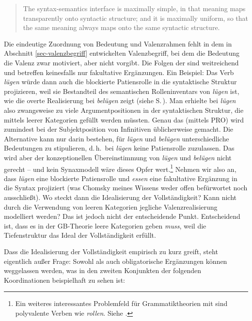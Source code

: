 \begin{quote}
The syntax-semantics interface is maximally simple, in that meaning maps transparently onto syntactic structure; and it is maximally uniform, so that the same meaning always maps onto the same syntactic structure. \citep[47]{Culicover:Jackendoff:05}
\end{quote}
Die eindeutige Zuordnung von Bedeutung und Valenzrahmen fehlt in dem in Abschnitt \ref{sec-valenzbegriff} entwickelten Valenzbegriff, bei dem die Bedeutung die Valenz zwar motiviert, aber nicht vorgibt. Die Folgen der  sind weitreichend und betreffen keinesfalls nur fakultative Ergänzungen. Ein Beispiel: Das Verb {\it lügen} würde dann auch die blockierte Patiensrolle in die syntaktische Struktur projizieren, weil sie Bestandteil des semantischen Rolleninventars von \textit{lügen} ist, wie die overte Realisierung bei {\it belügen} zeigt (siehe S.\,\pageref{ex-luegen}). Man erhielte bei \textit{lügen} also zwangsweise zu viele Argumentpositionen in der syntaktischen Struktur, die mittels leerer Kategorien gefüllt werden müssten. Genau das (mittels PRO) wird zumindest bei der Subjektposition von Infinitiven üblicherweise gemacht. Die Alternative kann nur darin bestehen, für {\it lügen} und {\it belügen} unterschiedliche Bedeutungen zu stipulieren, d.\,h.\ bei \textit{lügen} keine Patiensrolle zuzulassen. Das wird aber der konzeptionellen Übereinstimmung von \textit{lügen} und \textit{belügen} nicht gerecht -- und kein Synaxmodell wäre dieses Opfer wert.\footnote{Ein weiteres interessantes Problemfeld für Grammatiktheorien mit  sind polyvalente Verben wie {\it rollen}. Siehe \citet{Vogel:98}.} 
%
Nehmen wir also an, dass \textit{lügen} eine blockierte Patiensrolle und \textit{essen} eine fakultative Ergänzung in die Syntax projiziert (was Chomsky meines Wissens weder offen befürwortet noch ausschließt). Wo steckt dann die Idealisierung der Vollständigkeit? Kann nicht durch die Verwendung von leeren Kategorien jegliche Valenzrealisierung modelliert werden? Das ist jedoch nicht der entscheidende Punkt. Entscheidend ist, dass es in der GB-Theorie leere Kategorien geben {\it muss}, weil die Tiefenstruktur das Ideal der Vollständigkeit erfüllt.  %

Dass die Idealisierung der Vollständigkeit empirisch zu kurz greift, steht eigentlich au\ss er Frage: Sowohl  als auch obligatorische Ergänzungen können weggelassen werden, was in den zweiten Konjunkten der folgenden Koordinationen beispielhaft zu sehen ist:


